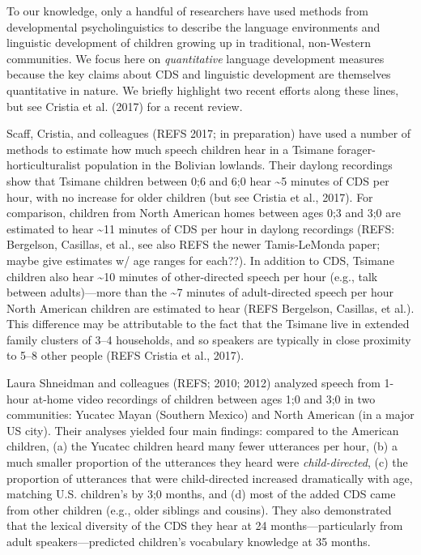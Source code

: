 \documentclass[man]{apa6}
\theoremstyle{definition}
\theoremstyle{definition}
\theoremstyle{definition}
\theoremstyle{remark}
\begin{document}
To our knowledge, only a handful of researchers have used methods from
developmental psycholinguistics to describe the language environments
and linguistic development of children growing up in traditional,
non-Western communities. We focus here on \emph{quantitative} language
development measures because the key claims about CDS and linguistic
development are themselves quantitative in nature. We briefly highlight
two recent efforts along these lines, but see Cristia et al. (2017) for
a recent review.

Scaff, Cristia, and colleagues (REFS 2017; in preparation) have used a
number of methods to estimate how much speech children hear in a Tsimane
forager-horticulturalist population in the Bolivian lowlands. Their
daylong recordings show that Tsimane children between 0;6 and 6;0 hear
\textasciitilde{}5 minutes of CDS per hour, with no increase for older
children (but see Cristia et al., 2017). For comparison, children from
North American homes between ages 0;3 and 3;0 are estimated to hear
\textasciitilde{}11 minutes of CDS per hour in daylong recordings (REFS:
Bergelson, Casillas, et al., see also REFS the newer Tamis-LeMonda
paper; maybe give estimates w/ age ranges for each??). In addition to
CDS, Tsimane children also hear \textasciitilde{}10 minutes of
other-directed speech per hour (e.g., talk between adults)---more than
the \textasciitilde{}7 minutes of adult-directed speech per hour North
American children are estimated to hear (REFS Bergelson, Casillas, et
al.). This difference may be attributable to the fact that the Tsimane
live in extended family clusters of 3--4 households, and so speakers are
typically in close proximity to 5--8 other people (REFS Cristia et al.,
2017).

Laura Shneidman and colleagues (REFS; 2010; 2012) analyzed speech from
1-hour at-home video recordings of children between ages 1;0 and 3;0 in
two communities: Yucatec Mayan (Southern Mexico) and North American (in
a major US city). Their analyses yielded four main findings: compared to
the American children, (a) the Yucatec children heard many fewer
utterances per hour, (b) a much smaller proportion of the utterances
they heard were \emph{child-directed}, (c) the proportion of utterances
that were child-directed increased dramatically with age, matching U.S.
children's by 3;0 months, and (d) most of the added CDS came from other
children (e.g., older siblings and cousins). They also demonstrated that
the lexical diversity of the CDS they hear at 24 months---particularly
from adult speakers---predicted children's vocabulary knowledge at 35
months.
\end{document}

